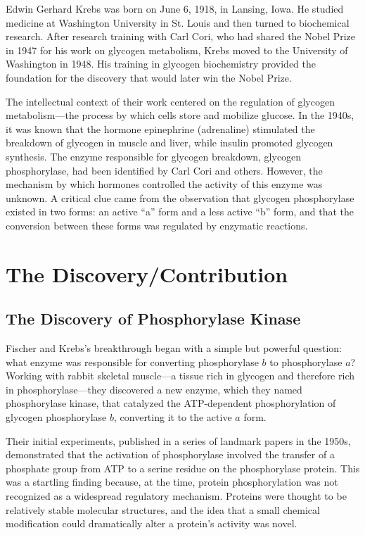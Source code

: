 Edwin Gerhard Krebs was born on June 6, 1918, in Lansing, Iowa. He studied medicine at Washington University in St. Louis and then turned to biochemical research. After research training with Carl Cori, who had shared the Nobel Prize in 1947 for his work on glycogen metabolism, Krebs moved to the University of Washington in 1948. His training in glycogen biochemistry provided the foundation for the discovery that would later win the Nobel Prize.

The intellectual context of their work centered on the regulation of glycogen metabolism---the process by which cells store and mobilize glucose. In the 1940s, it was known that the hormone epinephrine (adrenaline) stimulated the breakdown of glycogen in muscle and liver, while insulin promoted glycogen synthesis. The enzyme responsible for glycogen breakdown, glycogen phosphorylase, had been identified by Carl Cori and others. However, the mechanism by which hormones controlled the activity of this enzyme was unknown. A critical clue came from the observation that glycogen phosphorylase existed in two forms: an active ``a'' form and a less active ``b'' form, and that the conversion between these forms was regulated by enzymatic reactions.

\section{The Discovery/Contribution}

\subsection{The Discovery of Phosphorylase Kinase}

Fischer and Krebs's breakthrough began with a simple but powerful question: what enzyme was responsible for converting phosphorylase $b$ to phosphorylase $a$? Working with rabbit skeletal muscle---a tissue rich in glycogen and therefore rich in phosphorylase---they discovered a new enzyme, which they named phosphorylase kinase, that catalyzed the ATP-dependent phosphorylation of glycogen phosphorylase $b$, converting it to the active $a$ form.

Their initial experiments, published in a series of landmark papers in the 1950s, demonstrated that the activation of phosphorylase involved the transfer of a phosphate group from ATP to a serine residue on the phosphorylase protein. This was a startling finding because, at the time, protein phosphorylation was not recognized as a widespread regulatory mechanism. Proteins were thought to be relatively stable molecular structures, and the idea that a small chemical modification could dramatically alter a protein's activity was novel.

